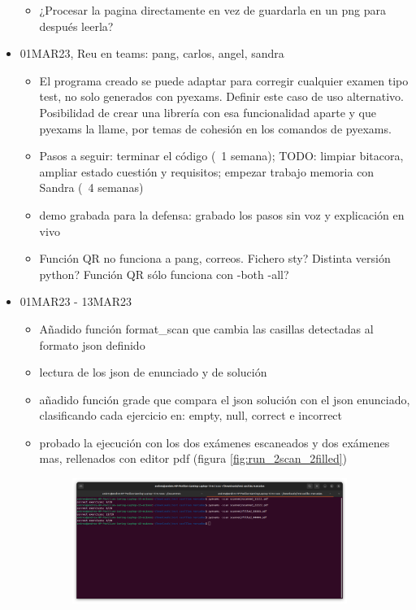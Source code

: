 \begin{itemize}
\begin{itemize}
        \item ¿Procesar la pagina directamente en vez de guardarla en un png para después leerla?
    \end{itemize}
    \item 01MAR23, Reu en teams: pang, carlos, angel, sandra
    \begin{itemize}
        \item El programa creado se puede adaptar para corregir cualquier examen tipo test, no solo generados con pyexams. Definir este caso de uso alternativo. Posibilidad de crear una librería con esa funcionalidad aparte y que pyexams la llame, por temas de cohesión en los comandos de pyexams.
        \item Pasos a seguir: terminar el código (~1 semana); TODO: limpiar bitacora, ampliar estado cuestión y requisitos; empezar trabajo memoria con Sandra (~4 semanas)
        \item demo grabada para la defensa: grabado los pasos sin voz y explicación en vivo
        \item Función QR no funciona a pang, correos. Fichero sty? Distinta versión python? Función QR sólo funciona con -both -all?
    \end{itemize}
    \item 01MAR23 - 13MAR23
    \begin{itemize}
        \item Añadido función format\_scan que cambia las casillas detectadas al formato json definido
        \item lectura de los json de enunciado y de solución
        \item añadido función grade que compara el json solución con el json enunciado, clasificando cada ejercicio en: empty, null, correct e incorrect
        \item probado la ejecución con los dos exámenes escaneados y dos exámenes mas, rellenados con editor pdf (figura \ref{fig:run_2scan_2filled})
        \begin{figure}
                \centering
                \includegraphics[width=0.9\textwidth]{figures/run_2scan_2filled.png}

\end{figure}
\end{itemize}
\end{itemize}
